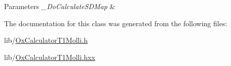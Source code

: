 \begin{DoxyParams}{Parameters}
{\em \-\_\-\-Do\-Calculate\-S\-D\-Map} & \\
\hline
\end{DoxyParams}


The documentation for this class was generated from the following files\-:\begin{DoxyCompactItemize}
\item 
lib/\hyperlink{_ox_calculator_t1_molli_8h}{Ox\-Calculator\-T1\-Molli.\-h}\item 
lib/\hyperlink{_ox_calculator_t1_molli_8hxx}{Ox\-Calculator\-T1\-Molli.\-hxx}\end{DoxyCompactItemize}

